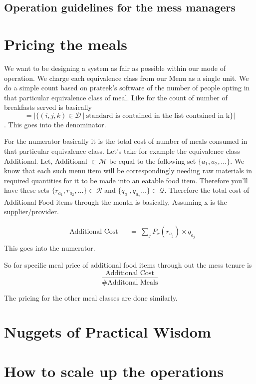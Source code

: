 \documentclass[12pt]{report}
\begin{document}
{\color{red}{Currently, in prateek's software prateek has the entire permissions and there is some trust levied onto him that he doesn't play foul.}}

\subsection{Operation guidelines for the mess managers}


\section{Pricing the meals}
We want to be designing a system as fair as possible within our mode of operation. We charge each equivalence class from our Menu as a single unit.  We do a simple count based on prateek's software of the number of people opting in that particular equivalence class of meal. Like for the count of number of breakfasts served is basically $$=| \{ (i,j,k) \in \mathcal{D}~ | ~ \text{standard is contained in the list contained in k}\}|$$. This goes into the denominator.

 For the numerator basically it is the total cost of number of meals consumed in that particular equivalence class. Let's take for example the equivalence class Additional. Let, Additional $\subset \mathcal{M}$ be equal to the following set $\{a_{1},a_{2},\ldots\}$. We know that each such menu item will be correspondingly needing raw materials in required quantities for it to be made into an eatable food item. Therefore you'll have these sets $\{r_{a_{1}},r_{a_{2}},\ldots\} \subset \mathcal{R}$ and $\{q_{a_{1}},q_{a_{2}}\ldots\}\subset \mathcal{Q}$. Therefore the total cost of Additional Food items through the month is basically, Assuming x is the supplier/provider.

\begin{equation*}
\begin{aligned}
& {\text{Additional Cost}}
& & = ~\sum_{j} P_{x}(r_{a_{j}})\times q_{a_{j}}\\
\end{aligned}
\end{equation*}
This goes into the numerator.

So for specific meal price of additional food items through out the mess tenure is $$\frac{\text{Additional Cost}}{\# \text{Additonal Meals}}$$

The pricing for the other meal classes are done similarly.

\section{Nuggets of Practical Wisdom}

\section{How to scale up the operations}
\end{document}
